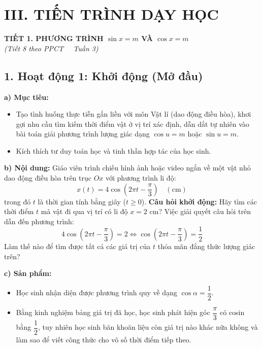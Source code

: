 \documentclass[12pt, a4paper]{article}
\begin{document}
\section*{III. TIẾN TRÌNH DẠY HỌC}  
  
\begin{center}  
    {\fontsize{13pt}{16pt}\selectfont \textbf{TIẾT 1. PHƯƠNG TRÌNH $\sin x = m$ VÀ $\cos x = m$}}\\[2pt]  
    \textit{(Tiết 8 theo PPCT \ \textbar \ Tuần 3)}  
\end{center}  
  
\subsection*{1. Hoạt động 1: Khởi động (Mở đầu)}  
  
\noindent \textbf{a) Mục tiêu:}  
\begin{itemize}[leftmargin=0.8cm]  
    \item Tạo tình huống thực tiễn gắn liền với môn Vật lí (dao động điều hòa), khơi gợi nhu cầu tìm kiếm thời điểm vật ở vị trí xác định, dẫn dắt tự nhiên vào bài toán giải phương trình lượng giác dạng $\cos u = m$ hoặc $\sin u = m$.  
    \item Kích thích tư duy toán học và tinh thần hợp tác của học sinh.  
\end{itemize}  
  
\noindent \textbf{b) Nội dung:}  
Giáo viên trình chiếu hình ảnh hoặc video ngắn về một vật nhỏ dao động điều hòa trên trục $Ox$ với phương trình li độ:  
$$x(t) = 4\cos\left(2\pi t - \dfrac{\pi}{3}\right) \quad (\text{cm})$$  
trong đó $t$ là thời gian tính bằng giây ($t \ge 0$).  
\textbf{Câu hỏi khởi động:} Hãy tìm các thời điểm $t$ mà vật đi qua vị trí có li độ $x = 2\text{ cm}$?  
Việc giải quyết câu hỏi trên dẫn đến phương trình:  
$$4\cos\left(2\pi t - \dfrac{\pi}{3}\right) = 2 \iff \cos\left(2\pi t - \dfrac{\pi}{3}\right) = \dfrac{1}{2}$$  
Làm thế nào để tìm được tất cả các giá trị của $t$ thỏa mãn đẳng thức lượng giác trên?  
  
\noindent \textbf{c) Sản phẩm:}  
\begin{itemize}[leftmargin=0.8cm]  
    \item Học sinh nhận diện được phương trình quy về dạng $\cos\alpha = \dfrac{1}{2}$.  
    \item Bằng kinh nghiệm bảng giá trị đã học, học sinh phát hiện góc $\dfrac{\pi}{3}$ có cosin bằng $\dfrac{1}{2}$, tuy nhiên học sinh băn khoăn liệu còn giá trị nào khác nữa không và làm sao để viết công thức cho vô số thời điểm tiếp theo.  
\end{itemize}  
  
\end{document}

